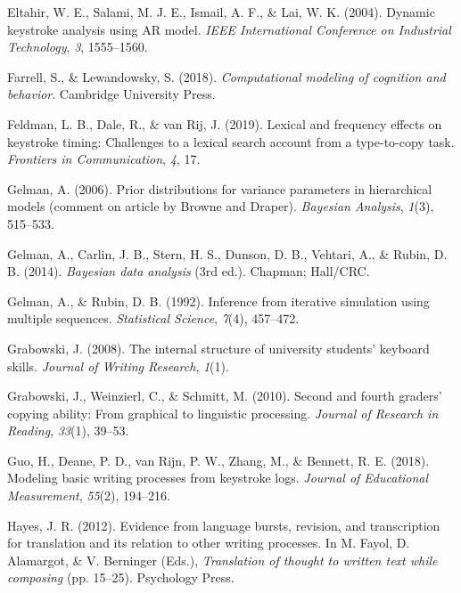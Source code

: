 \documentclass[
  english,
  man,mask,floatsintext]{apa7}
\newlength{\cslhangindent}
\newenvironment{cslreferences}%
  {\setlength{\parindent}{0pt}%
  \everypar{\setlength{\hangindent}{\cslhangindent}}\ignorespaces}%
  {\par}
\begin{document}
\begin{cslreferences}
\leavevmode\hypertarget{ref-eltahir2004dynamic}{}%
Eltahir, W. E., Salami, M. J. E., Ismail, A. F., \& Lai, W. K. (2004). Dynamic keystroke analysis using AR model. \emph{IEEE International Conference on Industrial Technology}, \emph{3}, 1555--1560.

\leavevmode\hypertarget{ref-farrell2018computational}{}%
Farrell, S., \& Lewandowsky, S. (2018). \emph{Computational modeling of cognition and behavior}. Cambridge University Press.

\leavevmode\hypertarget{ref-feldman2019lexical}{}%
Feldman, L. B., Dale, R., \& van Rij, J. (2019). Lexical and frequency effects on keystroke timing: Challenges to a lexical search account from a type-to-copy task. \emph{Frontiers in Communication}, \emph{4}, 17.

\leavevmode\hypertarget{ref-gelman2006prior}{}%
Gelman, A. (2006). Prior distributions for variance parameters in hierarchical models (comment on article by Browne and Draper). \emph{Bayesian Analysis}, \emph{1}(3), 515--533.

\leavevmode\hypertarget{ref-gelman2014}{}%
Gelman, A., Carlin, J. B., Stern, H. S., Dunson, D. B., Vehtari, A., \& Rubin, D. B. (2014). \emph{Bayesian data analysis} (3rd ed.). Chapman; Hall/CRC.

\leavevmode\hypertarget{ref-gelman1992}{}%
Gelman, A., \& Rubin, D. B. (1992). Inference from iterative simulation using multiple sequences. \emph{Statistical Science}, \emph{7}(4), 457--472.

\leavevmode\hypertarget{ref-grabowski2008internal}{}%
Grabowski, J. (2008). The internal structure of university students' keyboard skills. \emph{Journal of Writing Research}, \emph{1}(1).

\leavevmode\hypertarget{ref-grabowski2010second}{}%
Grabowski, J., Weinzierl, C., \& Schmitt, M. (2010). Second and fourth graders' copying ability: From graphical to linguistic processing. \emph{Journal of Research in Reading}, \emph{33}(1), 39--53.

\leavevmode\hypertarget{ref-guo2018modeling}{}%
Guo, H., Deane, P. D., van Rijn, P. W., Zhang, M., \& Bennett, R. E. (2018). Modeling basic writing processes from keystroke logs. \emph{Journal of Educational Measurement}, \emph{55}(2), 194--216.

\leavevmode\hypertarget{ref-hayes2012evidence}{}%
Hayes, J. R. (2012). Evidence from language bursts, revision, and transcription for translation and its relation to other writing processes. In M. Fayol, D. Alamargot, \& V. Berninger (Eds.), \emph{Translation of thought to written text while composing} (pp. 15--25). Psychology Press.


\end{cslreferences}
\end{document}
